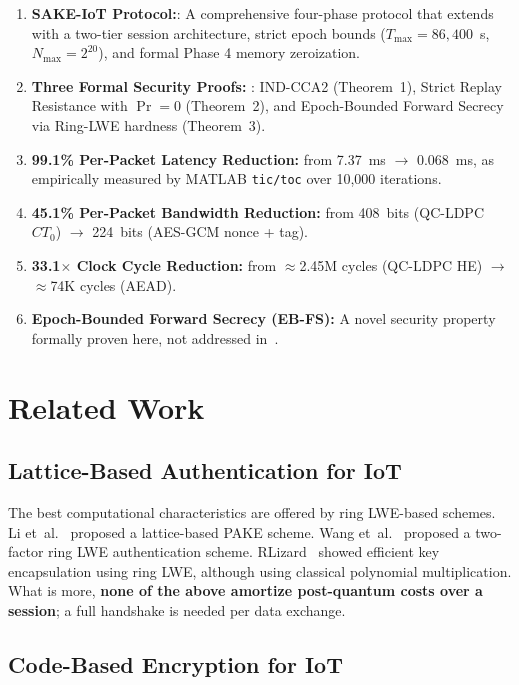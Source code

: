 \documentclass[conference]{IEEEtran}
\newcommand{\Nmax}{N_{\max}}
\newcommand{\Tmax}{T_{\max}}
\begin{document}
\begin{enumerate}

    \item \textbf{SAKE-IoT Protocol:}: A comprehensive four-phase protocol that extends~\cite{kumari2022} with a two-tier session architecture, strict epoch bounds ($\Tmax = 86{,}400$~s, $\Nmax = 2^{20}$), and formal Phase 4 memory zeroization.
    \item \textbf{Three Formal Security Proofs:} : IND-CCA2 (Theorem~1), Strict Replay Resistance with $\Pr = 0$ (Theorem~2), and Epoch-Bounded Forward Secrecy via Ring-LWE hardness (Theorem~3).
     \item \textbf{99.1\% Per-Packet Latency Reduction:} from 7.37~ms $\to$ 0.068~ms, as empirically measured by MATLAB \texttt{tic/toc} over 10,000 iterations.
    \item \textbf{45.1\% Per-Packet Bandwidth Reduction:} from 408~bits (QC-LDPC $CT_0$) $\to$ 224~bits (AES-GCM nonce + tag).
     \item \textbf{33.1$\times$ Clock Cycle Reduction:} from $\approx$2.45M cycles (QC-LDPC HE) $\to$ $\approx$74K cycles (AEAD).
     \item \textbf{Epoch-Bounded Forward Secrecy (EB-FS):} A novel security property formally proven here, not addressed in~\cite{kumari2022}.
\end{enumerate}

\section{Related Work}
\label{sec:related}

\subsection{Lattice-Based Authentication for IoT}

The best computational characteristics are offered by ring LWE-based schemes. Li et~al.~\cite{li2020} proposed a lattice-based PAKE scheme. Wang et~al.~\cite{wang2019} proposed a two-factor ring LWE authentication scheme. RLizard~\cite{lee2019} showed efficient key encapsulation using ring LWE, although using classical polynomial multiplication. What is more, \textbf{none of the above amortize
post-quantum costs over a session}; a full handshake is needed per data exchange.
\subsection{Code-Based Encryption for IoT}
\end{document}
